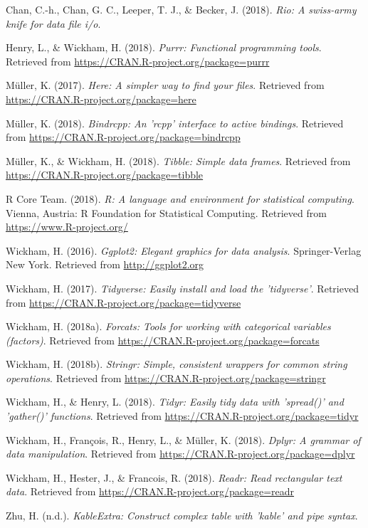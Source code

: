 \documentclass[man]{apa6}
\begin{document}
\hypertarget{ref-R-rio}{}
Chan, C.-h., Chan, G. C., Leeper, T. J., \& Becker, J. (2018).
\emph{Rio: A swiss-army knife for data file i/o}.

\hypertarget{ref-R-purrr}{}
Henry, L., \& Wickham, H. (2018). \emph{Purrr: Functional programming
tools}. Retrieved from \url{https://CRAN.R-project.org/package=purrr}

\hypertarget{ref-R-here}{}
Müller, K. (2017). \emph{Here: A simpler way to find your files}.
Retrieved from \url{https://CRAN.R-project.org/package=here}

\hypertarget{ref-R-bindrcpp}{}
Müller, K. (2018). \emph{Bindrcpp: An 'rcpp' interface to active
bindings}. Retrieved from
\url{https://CRAN.R-project.org/package=bindrcpp}

\hypertarget{ref-R-tibble}{}
Müller, K., \& Wickham, H. (2018). \emph{Tibble: Simple data frames}.
Retrieved from \url{https://CRAN.R-project.org/package=tibble}

\hypertarget{ref-R-base}{}
R Core Team. (2018). \emph{R: A language and environment for statistical
computing}. Vienna, Austria: R Foundation for Statistical Computing.
Retrieved from \url{https://www.R-project.org/}

\hypertarget{ref-R-ggplot2}{}
Wickham, H. (2016). \emph{Ggplot2: Elegant graphics for data analysis}.
Springer-Verlag New York. Retrieved from \url{http://ggplot2.org}

\hypertarget{ref-R-tidyverse}{}
Wickham, H. (2017). \emph{Tidyverse: Easily install and load the
'tidyverse'}. Retrieved from
\url{https://CRAN.R-project.org/package=tidyverse}

\hypertarget{ref-R-forcats}{}
Wickham, H. (2018a). \emph{Forcats: Tools for working with categorical
variables (factors)}. Retrieved from
\url{https://CRAN.R-project.org/package=forcats}

\hypertarget{ref-R-stringr}{}
Wickham, H. (2018b). \emph{Stringr: Simple, consistent wrappers for
common string operations}. Retrieved from
\url{https://CRAN.R-project.org/package=stringr}

\hypertarget{ref-R-tidyr}{}
Wickham, H., \& Henry, L. (2018). \emph{Tidyr: Easily tidy data with
'spread()' and 'gather()' functions}. Retrieved from
\url{https://CRAN.R-project.org/package=tidyr}

\hypertarget{ref-R-dplyr}{}
Wickham, H., François, R., Henry, L., \& Müller, K. (2018). \emph{Dplyr:
A grammar of data manipulation}. Retrieved from
\url{https://CRAN.R-project.org/package=dplyr}

\hypertarget{ref-R-readr}{}
Wickham, H., Hester, J., \& Francois, R. (2018). \emph{Readr: Read
rectangular text data}. Retrieved from
\url{https://CRAN.R-project.org/package=readr}

\hypertarget{ref-R-kableExtra}{}
Zhu, H. (n.d.). \emph{KableExtra: Construct complex table with 'kable'
and pipe syntax}.

\endgroup
\end{document}
